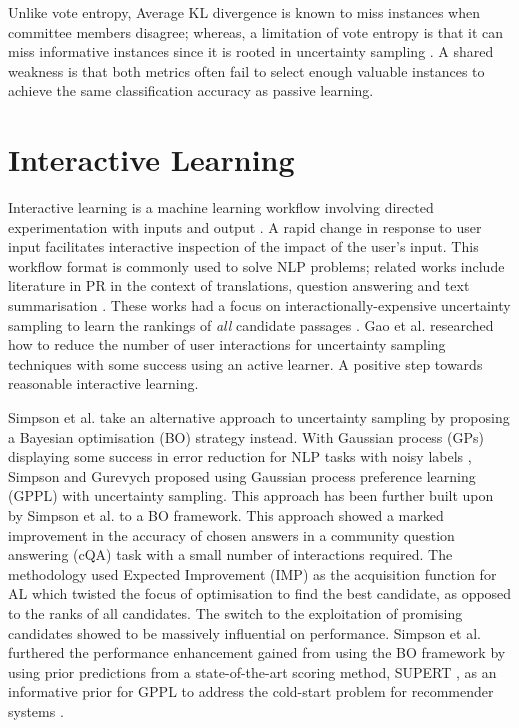 \documentclass[ %
                    author={James Stephenson},
                supervisor={Dr. Edwin Simpson},
                    degree={MSc},
                     title={PROJECT PLAN},
                  subtitle={Bayesian Deep Learning For Extractive Test Summarisation},
                      type={},
                      year={2022}]{../additions/dissertation}
\begin{document}
				\medbreak
				Unlike vote entropy, Average KL divergence is known to miss instances when committee members disagree; whereas, a limitation of vote entropy is that it can miss informative instances since it is rooted in uncertainty sampling \cite{Li06}. A shared weakness is that both metrics often fail to select enough valuable instances to achieve the same classification accuracy as passive learning.
		
		\section{Interactive Learning}
		\label{chap:literaturereview:interactive}
		
			Interactive learning is a machine learning workflow involving directed experimentation with inputs and output \cite{Amershi14}. A rapid change in response to user input facilitates interactive inspection of the impact of the user’s input.  This workflow format is commonly used to solve NLP problems; related works include literature in PR in the context of translations, question answering and text summarisation \cite{Peris18, Lin17, PVS17}. These works had a focus on interactionally-expensive uncertainty sampling to learn the rankings of \emph{all} candidate passages \cite{Simpson19}. Gao et al. \cite{Gao18} researched how to reduce the number of user interactions for uncertainty sampling techniques with some success using an active learner. A positive step towards reasonable interactive learning.

			\medbreak
			Simpson et al. \cite{Simpson19} take an alternative approach to uncertainty sampling by proposing a Bayesian optimisation (BO) strategy instead. With Gaussian process (GPs) displaying some success in error reduction for NLP tasks with noisy labels \cite{Cohn13, Beck14}, Simpson and Gurevych \cite{Simpson18} proposed using Gaussian process preference learning (GPPL) with uncertainty sampling. This approach has been further built upon by Simpson et al. \cite{Simpson19} to a BO framework. This approach showed a marked improvement in the accuracy of chosen answers in a community question answering (cQA) task with a small number of interactions required. The methodology used Expected Improvement (IMP) as the acquisition function for AL which twisted the focus of optimisation to find the best candidate, as opposed to the ranks of all candidates. The switch to the exploitation of promising candidates showed to be massively influential on performance. Simpson et al. \cite{Simpson19} furthered the performance enhancement gained from using the BO framework by using prior predictions from a state-of-the-art scoring method, SUPERT \cite{Gao20}, as an informative prior for GPPL to address the cold-start problem for recommender systems \cite{Bobadilla12}.
		
\end{document}

